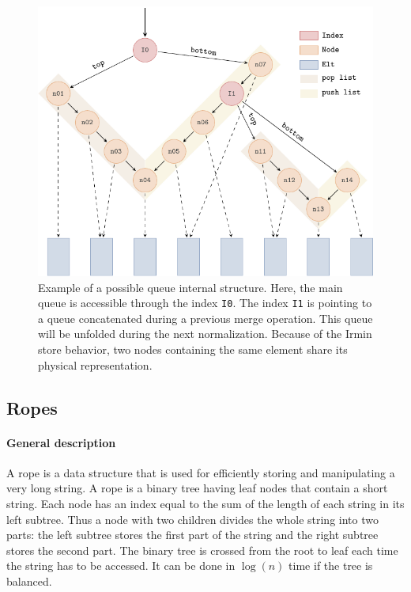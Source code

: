 \documentclass{article}
\newcommand{\irmin}{Irmin\xspace}
\newcommand{\code}[1]{\texttt{#1}}
\begin{document}
\begin{figure}[hbt]
\centering
\includegraphics[scale=0.6]{images/queue.pdf}
\caption{Example of a possible queue internal structure. Here, the main queue is accessible through the index \code{I0}. The index \code{I1} is pointing to a queue concatenated during a previous merge operation. This queue will be unfolded during the next normalization. Because of the \irmin store behavior,  two nodes containing the same element share its physical representation.}
\label{queuegraph}
\end{figure}


\subsection{Ropes}

\paragraph{General description}
A rope is a data structure that is used for efficiently storing and manipulating a very long string.
A rope is a binary tree having leaf nodes that contain a short string.
Each node has an index equal to the sum of the length of each string in its left subtree.
Thus a node with two children divides the whole string into two parts: the left subtree stores the first part of the string and the right subtree stores the second part.
The binary tree is crossed from the root to leaf each time the string has to be accessed.
It can be done in $\log (n)$ time if the tree is balanced.
\end{document}
